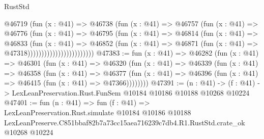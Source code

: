 \begin{lexlean}{RustStd}
\begin{coremodule}
                                @46719
                                  (fun (x : @41) =>
                                  @46738
                                    (fun (x : @41) =>
                                    @46757
                                      (fun (x : @41) =>
                                      @46776
                                        (fun (x : @41) =>
                                        @46795
                                          (fun (x : @41) =>
                                          @46814
                                            (fun (x : @41) =>
                                            @46833
                                              (fun (x : @41) =>
                                              @46852
                                                (fun (x : @41) =>
                                                @46871
                                                  (fun (x : @41) => @47318))))))))))))))))))))))))
@47383 := fun (x : @41) =>
  @46282
    (fun (x : @41) =>
    @46301
      (fun (x : @41) =>
      @46320
        (fun (x : @41) =>
        @46339
          (fun (x : @41) =>
          @46358
            (fun (x : @41) =>
            @46377
              (fun (x : @41) => @46396 (fun (x : @41) => @46415 (fun (x : @41) => @47366))))))))
@47391 := (n : @41) ->
  (f : @41) -> LexLeanPreservation.Rust.FunSem @10184 @10186 @10188 @10268 @10224
@47401 := fun (n : @41) =>
  fun (f : @41) =>
  LexLeanPreservation.Rust.simulate
    @10184
    @10186
    @10188
    LexLeanPreserve.C851bbaf82b7a73cc15aea716239c7db4.R1.RustStd.crate_ok
    @10268
    @10224
\end{coremodule}
\end{lexlean}
